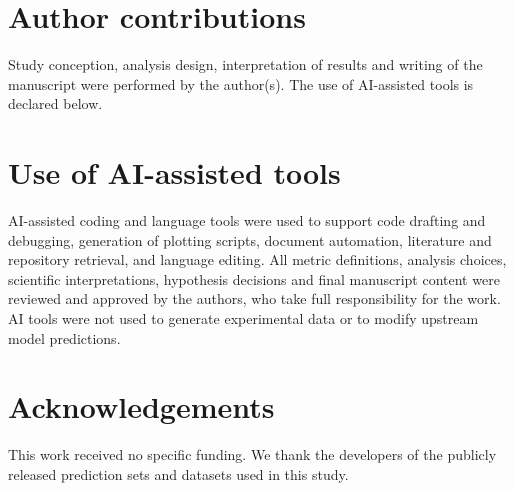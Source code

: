 \documentclass[11pt,a4paper]{article}
\begin{document}
\section*{Author contributions}
Study conception, analysis design, interpretation of results and writing of the manuscript
were performed by the author(s). The use of AI-assisted tools is declared below.

\section*{Use of AI-assisted tools}
AI-assisted coding and language tools were used to support code drafting and debugging,
generation of plotting scripts, document automation, literature and repository retrieval,
and language editing. All metric definitions, analysis choices, scientific interpretations,
hypothesis decisions and final manuscript content were reviewed and approved by the authors,
who take full responsibility for the work. AI tools were not used to generate experimental
data or to modify upstream model predictions.

\section*{Acknowledgements}
This work received no specific funding. We thank the developers of the publicly released prediction sets and
datasets used in this study.



\end{document}
